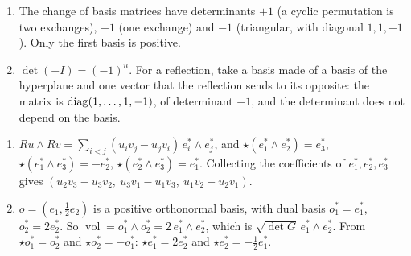 \begin{enumerate}[nosep]
  \item The change of basis matrices have determinants $+1$ (a cyclic
        permutation is two exchanges), $-1$ (one exchange) and $-1$
        (triangular, with diagonal $1, 1, -1$). Only the first basis is
        positive.
  \item $\det(-I) = (-1)^n$. For a reflection, take a basis made of a
        basis of the hyperplane and one vector that the reflection
        sends to its opposite: the matrix is $\operatorname{diag}(1,\dots,1,-1)$,
        of determinant $-1$, and the determinant does not depend on the
        basis.
\end{enumerate}

\begin{enumerate}[nosep]
  \item $Ru\wedge Rv = \sum_{i<j}(u_iv_j - u_jv_i)\,e_i^*\wedge e_j^*$,
        and $\star(e_1^*\wedge e_2^*) = e_3^*$,
        $\star(e_1^*\wedge e_3^*) = -e_2^*$,
        $\star(e_2^*\wedge e_3^*) = e_1^*$. Collecting the coefficients
        of $e_1^*, e_2^*, e_3^*$ gives
        $(u_2v_3 - u_3v_2,\ u_3v_1 - u_1v_3,\ u_1v_2 - u_2v_1)$.
  \item $o = (e_1, \frac12e_2)$ is a positive orthonormal basis, with
        dual basis $o_1^* = e_1^*$, $o_2^* = 2e_2^*$. So
        $\operatorname{vol} = o_1^*\wedge o_2^* = 2\,e_1^*\wedge e_2^*$,
        which is $\sqrt{\det G}\,e_1^*\wedge e_2^*$. From
        $\star o_1^* = o_2^*$ and $\star o_2^* = -o_1^*$:
        $\star e_1^* = 2e_2^*$ and $\star e_2^* = -\frac12e_1^*$.
\end{enumerate}

\section{}

